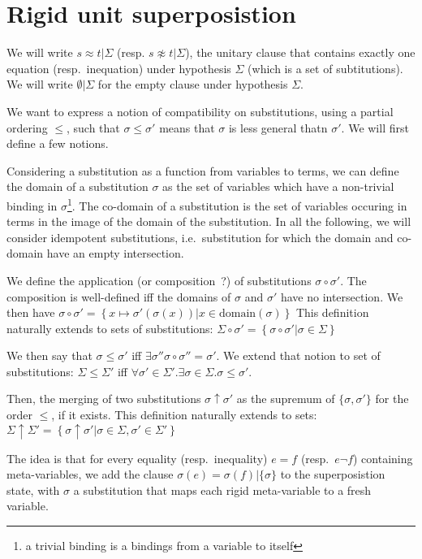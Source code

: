 
\section{Rigid unit superposistion}

\EnableBpAbbreviations{}

We will write $s \approx t | \Sigma$ (resp. $s \not\approx t | \Sigma$),
the unitary clause that contains exactly one equation (resp.~inequation)
under hypothesis $\Sigma$ (which is a set of subtitutions).
We will write $\emptyset | \Sigma$ for the empty clause under hypothesis $\Sigma$.

We want to express a notion of compatibility on substitutions, using a
partial ordering $\leq$, such that $\sigma \leq \sigma'$ means that $\sigma$ is
less general thatn $\sigma'$. We will first define a few notions.


Considering a substitution as a function from variables to terms, we can define
the domain of a substitution $\sigma$ as the set of variables which have a non-trivial
binding in $\sigma$\footnote{a trivial binding is a bindings from a variable to itself}.
The co-domain of a substitution is the set of variables occuring in terms in the image of
the domain of the substitution.
In all the following, we will consider idempotent substitutions, i.e.~substitution for which
the domain and co-domain have an empty intersection.


We define the application (or composition~?) of substitutions $\sigma \circ \sigma'$.
The composition is well-defined iff the domains of $\sigma$ and $\sigma'$ have no
intersection. We then have
$\sigma \circ \sigma' = \left\{ x \mapsto \sigma'(\sigma(x)) | x \in \text{domain}(\sigma) \right\}$
This definition naturally extends to sets of substitutions:
$\Sigma \circ \sigma' = \left\{ \sigma \circ \sigma' | \sigma \in \Sigma \right\}$


We then say that $\sigma \leq \sigma'$ iff $\exists \sigma'' \sigma \circ \sigma'' = \sigma'$.
We extend that notion to set of substitutions:
$\Sigma \leq \Sigma'$ iff $\forall \sigma' \in \Sigma'. \exists \sigma \in \Sigma. \sigma \leq \sigma'$.

Then, the merging of two substitutions $\sigma \uparrow \sigma'$ as the supremum of $\{\sigma,\sigma'\}$
for the order $\leq$, if it exists. This definition naturally extends to sets:
$\Sigma \uparrow \Sigma' = \left\{ \sigma \uparrow \sigma' | \sigma \in \Sigma, \sigma' \in \Sigma' \right\}$


The idea is that for every equality (resp.~inequality) $e = f$ (resp.~$e \neg f$) containing meta-variables,
we add the clause $\sigma(e) = \sigma(f) | \{ \sigma \}$ to the superposistion state, with
$\sigma$ a substitution that maps each rigid meta-variable to a fresh variable.


